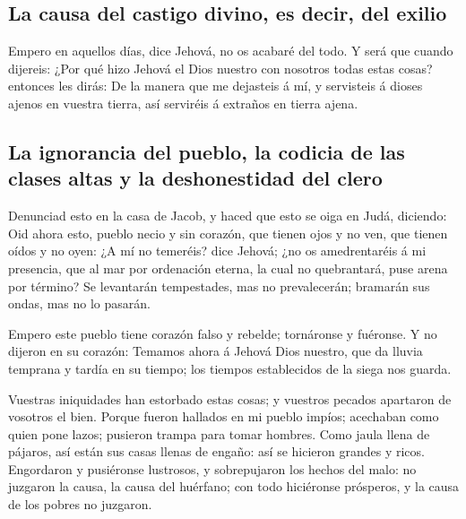 \hypertarget{la-causa-del-castigo-divino-es-decir-del-exilio}{%
\subsection{La causa del castigo divino, es decir, del
exilio}\label{la-causa-del-castigo-divino-es-decir-del-exilio}}

 Empero en aquellos días, dice Jehová, no os acabaré del
todo.  Y será que cuando dijereis: ¿Por qué hizo Jehová el
Dios nuestro con nosotros todas estas cosas? entonces les dirás: De la
manera que me dejasteis á mí, y servisteis á dioses ajenos en vuestra
tierra, así serviréis á extraños en tierra ajena.

\hypertarget{la-ignorancia-del-pueblo-la-codicia-de-las-clases-altas-y-la-deshonestidad-del-clero}{%
\subsection{La ignorancia del pueblo, la codicia de las clases altas y
la deshonestidad del
clero}\label{la-ignorancia-del-pueblo-la-codicia-de-las-clases-altas-y-la-deshonestidad-del-clero}}

 Denunciad esto en la casa de Jacob, y haced que esto se
oiga en Judá, diciendo:  Oid ahora esto, pueblo necio y sin
corazón, que tienen ojos y no ven, que tienen oídos y no oyen:
 ¿A mí no temeréis? dice Jehová; ¿no os amedrentaréis á mi
presencia, que al mar por ordenación eterna, la cual no quebrantará,
puse arena por término? Se levantarán tempestades, mas no prevalecerán;
bramarán sus ondas, mas no lo pasarán.

 Empero este pueblo tiene corazón falso y rebelde;
tornáronse y fuéronse.  Y no dijeron en su corazón: Temamos
ahora á Jehová Dios nuestro, que da lluvia temprana y tardía en su
tiempo; los tiempos establecidos de la siega nos guarda.

 Vuestras iniquidades han estorbado estas cosas; y vuestros
pecados apartaron de vosotros el bien.  Porque fueron
hallados en mi pueblo impíos; acechaban como quien pone lazos; pusieron
trampa para tomar hombres.  Como jaula llena de pájaros,
así están sus casas llenas de engaño: así se hicieron grandes y ricos.
 Engordaron y pusiéronse lustrosos, y sobrepujaron los
hechos del malo: no juzgaron la causa, la causa del huérfano; con todo
hiciéronse prósperos, y la causa de los pobres no juzgaron.

